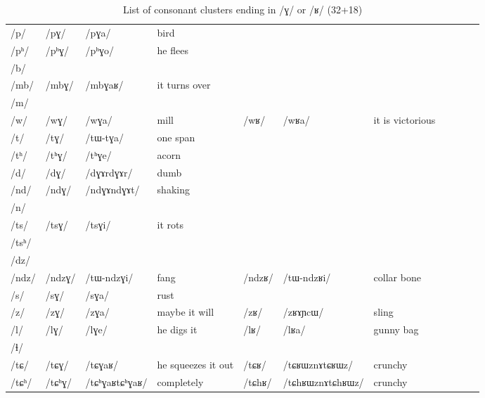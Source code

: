 \documentclass[oldfontcommands,oneside,a4paper,11pt]{article}
\newcommand{\ipa}[1]{\mbox{/#1/}} %
\newcommand{\deux}[1]{/#1/}
\newcommand{\idph}[1]{\cellcolor{gray}\textbf{#1}}
\begin{document}
\begin{landscape}
	   \begin{longtable}{l|lll|lll|lll|l}
 \caption{List of consonant clusters ending in \ipa{ɣ} or \ipa{ʁ} (32+18)} \\%
\toprule					
\ipa{p}  	&  \deux{pɣ}  	&  \ipa{pɣa}  	& bird  	&  	&   	& \\	
\ipa{pʰ}  	&  \deux{pʰɣ}  	&  \ipa{pʰɣo}  	& he flees 	&	&	& \\	
\ipa{b}  	&    	&    	&  	&	&	& \\	
\ipa{mb}  	&  \deux{mbɣ}  	&  \ipa{mbɣaʁ}  	&it turns over  	&	&	& \\	
\ipa{m}  	&    	&    	&  	&	&	& \\	
\ipa{w}  	&  \deux{wɣ}  	&  \ipa{wɣa}  	&mill	& \deux{wʁ}  	&  \ipa{wʁa} 	&it is victorious \\	
\ipa{t}  	&  \deux{tɣ}  	&  \ipa{tɯ-tɣa}  	& one span 	&	&	& \\	
\ipa{tʰ}  	&  \deux{tʰɣ}  	&  \ipa{tʰɣe}  	&  acorn	&	&	& \\	
\ipa{d}  	&  \deux{dɣ}  \idph{}	&  \ipa{dɣɤrdɣɤr}  	& dumb 	&	&	& \\	
\ipa{nd}  	&  \deux{ndɣ}  \idph{}	&  \ipa{ndɣɤndɣɤt}  	& shaking	&	&	& \\	
\ipa{n}  	&    	&    	&  	&	&	& \\	
\ipa{ts}  	&  \deux{tsɣ}  	&  \ipa{tsɣi}  	&  it rots	& 	&  	&  	& \\
\ipa{tsʰ}  	&    	&    	&  	&	&	& \\	
\ipa{dz}  	&    	&    	&  	&	&	& \\	
\ipa{ndz}  	&  \deux{ndzɣ}  	&  \ipa{tɯ-ndzɣi}  	& fang 	&\deux{ndzʁ}  	&  \ipa{tɯ-ndzʁi} 	&collar bone	& \\
\ipa{s}  	&  \deux{sɣ}  	&  \ipa{sɣa}  	&rust  	&	&	& \\	
\ipa{z}  	&  \deux{zɣ}  	&  \ipa{zɣa}  	&maybe it will  	& \deux{zʁ}  	&  \ipa{zʁɤɲcɯ} 	&sling \\	
\ipa{l}  	&  \deux{lɣ}  	&  \ipa{lɣe}  	&he digs it  	&\deux{lʁ} 	&\ipa{lʁa} 	&gunny bag \\	
\ipa{ɬ}  	&    	&    	&  	&	&	& \\	
\ipa{tɕ}  	&  \deux{tɕɣ}  	&  \ipa{tɕɣaʁ}  	&he squeezes it out  	&\deux{tɕʁ}  \idph{}	&  \ipa{tɕʁɯznɤtɕʁɯz}	&crunchy  	& \\
\ipa{tɕʰ}  	&  \deux{tɕʰɣ} \idph{} 	&  \ipa{tɕʰɣaʁtɕʰɣaʁ}  	&completely  	&\deux{tɕhʁ}  \idph{}	&  \ipa{tɕhʁɯznɤtɕhʁɯz}	&crunchy  	& \\

\end{longtable}
\end{landscape}
\end{document}
